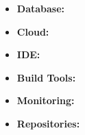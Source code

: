 \divider


    


\begin{itemize}
    \item {\textbf{Database:}}
\end{itemize}

\divider

\begin{itemize}
    \item {\textbf{Cloud:}}
\end{itemize}

\divider


\begin{itemize}
    \item {\textbf{IDE:}}
\end{itemize}
\begin{itemize}
    \item {\textbf{Build Tools:}}
\end{itemize}
\begin{itemize}
    \item \textbf{{Monitoring:}}
\end{itemize}
\begin{itemize}
    \item \textbf{{Repositories:}}
\end{itemize}



